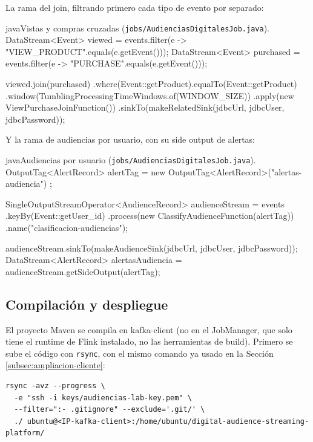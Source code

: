 La rama del join, filtrando primero cada tipo de evento por separado:

\begin{sourcecode}[\label{code:main-join}]{java}{Vistas y compras cruzadas (\texttt{jobs/AudienciasDigitalesJob.java}).}
DataStream<Event> viewed = events.filter(e -> "VIEW_PRODUCT".equals(e.getEvent()));
DataStream<Event> purchased = events.filter(e -> "PURCHASE".equals(e.getEvent()));

viewed.join(purchased)
        .where(Event::getProduct).equalTo(Event::getProduct)
        .window(TumblingProcessingTimeWindows.of(WINDOW_SIZE))
        .apply(new ViewPurchaseJoinFunction())
        .sinkTo(makeRelatedSink(jdbcUrl, jdbcUser, jdbcPassword));
\end{sourcecode}

Y la rama de audiencias por usuario, con su side output de alertas:

\begin{sourcecode}[\label{code:main-audiencias}]{java}{Audiencias por usuario (\texttt{jobs/AudienciasDigitalesJob.java}).}
OutputTag<AlertRecord> alertTag = new OutputTag<AlertRecord>("alertas-audiencia") {};

SingleOutputStreamOperator<AudienceRecord> audienceStream = events
        .keyBy(Event::getUser_id)
        .process(new ClassifyAudienceFunction(alertTag))
        .name("clasificacion-audiencias");

audienceStream.sinkTo(makeAudienceSink(jdbcUrl, jdbcUser, jdbcPassword));
DataStream<AlertRecord> alertasAudiencia = audienceStream.getSideOutput(alertTag);
\end{sourcecode}

\subsection{Compilación y despliegue}

El proyecto Maven se compila en kafka-client (no en el JobManager, que solo tiene el runtime de Flink instalado, no las herramientas de build). Primero se sube el código con \texttt{rsync}, con el mismo comando ya usado en la Sección \ref{subsec:ampliacion-cliente}:

\begin{lstlisting}[style=cmdbox]
rsync -avz --progress \
  -e "ssh -i keys/audiencias-lab-key.pem" \
  --filter=":- .gitignore" --exclude='.git/' \
  ./ ubuntu@<IP-kafka-client>:/home/ubuntu/digital-audience-streaming-platform/
\end{lstlisting}

